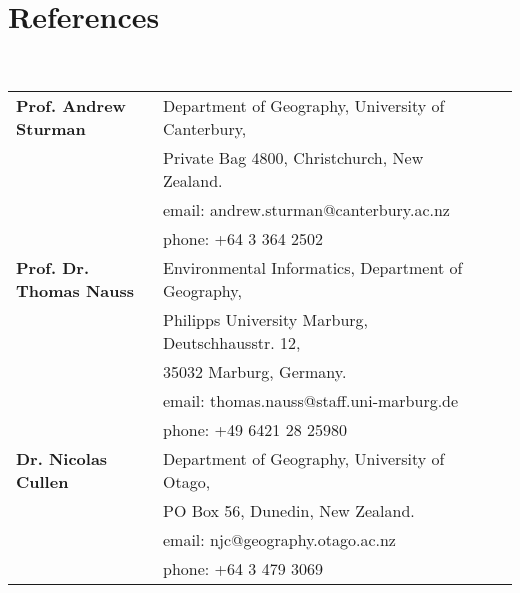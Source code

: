 \documentclass[a4paper,11pt]{article}
\begin{document}
\section{References}
\hrulefill \\
\begin{tabular}{llll} \\
\textbf{Prof. Andrew Sturman} & Department of Geography, University of Canterbury,\\
					 & Private Bag 4800, Christchurch, New Zealand.\\
					 & email: andrew.sturman@canterbury.ac.nz\\
					 & phone: +64 3 364 2502\\

\textbf{Prof. Dr. Thomas Nauss} & Environmental Informatics, Department of Geography,\\
					   & Philipps University Marburg, Deutschhausstr. 12,\\
					   & 35032 Marburg, Germany.\\
					   & email: thomas.nauss@staff.uni-marburg.de\\
					   & phone: +49 6421 28 25980\\

\textbf{Dr. Nicolas Cullen} & Department of Geography, University of Otago,\\
				   & PO Box 56, Dunedin, New Zealand.\\
				   & email: njc@geography.otago.ac.nz\\
				   & phone: +64 3 479 3069
\end{tabular}
\linebreak{}

\begin{publications}
\hrulefill \\
\end{publications}
\end{document}
